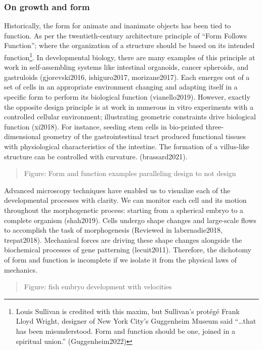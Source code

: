 \documentclass[
]{article}
\begin{document}
\hypertarget{on-growth-and-form}{%
\subsubsection{On growth and form}\label{on-growth-and-form}}

Historically, the form for animate and inanimate objects has been tied
to function. As per the twentieth-century architecture principle of
``Form Follows Function''; where the organization of a structure should
be based on its intended function\footnote{Louis Sullivan is credited
  with this maxim, but Sullivan's protégé Frank Lloyd Wright, designer
  of New York City's Guggenheim Museum said ``\ldots that has been
  misunderstood. Form and function should be one, joined in a spiritual
  union.'' (Guggenheim2022)}. In developmental biology, there are many
examples of this principle at work in self-assembling systems like
intestinal organoids, cancer spheroids, and gastruloids (gjorevski2016,
ishiguro2017, morizane2017). Each emerges out of a set of cells in an
appropriate environment changing and adapting itself in a specific form
to perform its biological function (vianello2019). However, exactly the
opposite design principle is at work in numerous in vitro experiments
with a controlled cellular environment; illustrating geometric
constraints drive biological function (xi2018). For instance, seeding
stem cells in bio-printed three-dimensional geometry of the
gastrointestinal tract produced functional tissues with physiological
characteristics of the intestine. The formation of a villus-like
structure can be controlled with curvature. (brassard2021).

\begin{quote}
Figure: Form and function examples paralleling design to not design
\end{quote}

Advanced microscopy techniques have enabled us to visualize each of the
developmental processes with clarity. We can monitor each cell and its
motion throughout the morphogenetic process: starting from a spherical
embryo to a complete organism (shah2019). Cells undergo shape changes
and large-scale flows to accomplish the task of morphogenesis (Reviewed
in labernadie2018, trepat2018). Mechanical forces are driving these
shape changes alongside the biochemical processes of gene patterning
(lecuit2011). Therefore, the dichotomy of form and function is
incomplete if we isolate it from the physical laws of mechanics.

\begin{quote}
Figure: fish embryo development with velocities
\end{quote}
\end{document}
